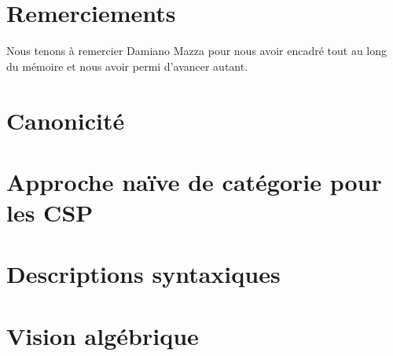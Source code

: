 \documentclass[12pt]{article}
\begin{document}
\section*{Remerciements}

Nous tenons à remercier Damiano Mazza pour nous avoir encadré tout au long du
mémoire et nous avoir permi d'avancer autant.


\appendix
\newpage
\section{Canonicité}\label{appCanon}


\newpage
\section{Approche naïve de catégorie pour les CSP}\label{appNaif}


\newpage
\section{Descriptions syntaxiques}\label{appSyn}


\newpage
\section{Vision algébrique}\label{appClones}

\end{document}
